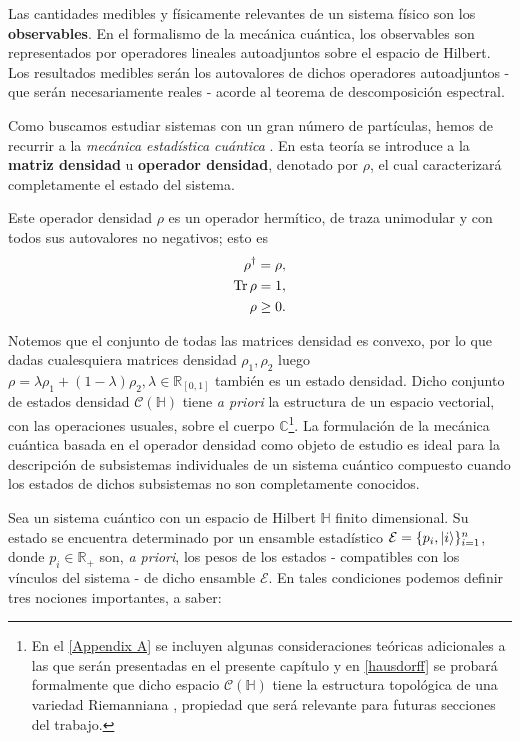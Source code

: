\documentclass{report} %
\numberwithin{equation}{section}
\begin{document}
Las cantidades medibles y físicamente relevantes de un sistema físico son los \textbf{observables}. En el formalismo de la mecánica cuántica, los observables son representados por operadores lineales autoadjuntos sobre el espacio de Hilbert. Los resultados medibles serán los autovalores de dichos operadores autoadjuntos - que serán necesariamente reales - acorde al teorema de descomposición espectral.

Como buscamos estudiar sistemas con un gran número de partículas, hemos de recurrir a la \textit{mecánica estadística cuántica} \cite{PATHRIA2011115,Nielsen.00,HeinzPetruccione}. 
En esta teoría se introduce a la \textbf{matriz densidad} u \textbf{operador densidad}, denotado por $\rho$, el cual caracterizará completamente el estado del sistema. 

\noindent Este {operador densidad} $\rho$ es un operador hermítico, de traza unimodular y con todos sus autovalores no negativos; esto es
\begin{subequations}
\begin{align}
    \rho^{\dagger} = \rho, \\
    \Tr \rho = 1, \\
    \rho \geq 0.
\end{align}
\end{subequations}

Notemos que el conjunto de todas las matrices densidad es convexo, por lo que dadas cualesquiera matrices densidad $\rho_1, \rho_2$ luego $\rho = \lambda\rho_1+ (1-\lambda)\rho_2, \lambda \in \mathds{R}_{[0,1]}$ también es un estado densidad. Dicho conjunto de estados densidad $\mathcal{C}(\mathds{H})$ tiene \textit{a priori} la estructura de un espacio vectorial, con las operaciones usuales, sobre el cuerpo $\mathds{C}$\footnote{En el \autoref{Appendix A} se incluyen algunas consideraciones teóricas adicionales a las que serán presentadas en el presente capítulo y en \autoref{hausdorff} se probará formalmente que dicho espacio $\mathcal{C}(\mathds{H})$ tiene la estructura topológica de una variedad Riemanniana \cite{GoldbartStone, NakaharaM}, propiedad que será relevante para futuras secciones del trabajo.}. La formulación de la mecánica cuántica basada en el operador densidad como objeto de estudio es ideal para la descripción de subsistemas individuales de un sistema cuántico compuesto \cite{Nielsen.00} cuando los estados de dichos subsistemas no son completamente conocidos. 

Sea un sistema cuántico con un espacio de Hilbert $\mathds{H}$ finito dimensional. Su estado se encuentra determinado por un ensamble estadístico \cite{Nielsen.00, PATHRIA2011115} $\mathcal{E} = \{p_i,\ket{i}\}_{i=1}^{n}$, donde $p_i \in \mathds{R}_{+}$ son, \textit{a priori}, los pesos de los estados - compatibles con los vínculos del sistema - de dicho ensamble $\mathcal{E}$. En tales condiciones podemos definir tres nociones importantes, a saber:
\end{document}
